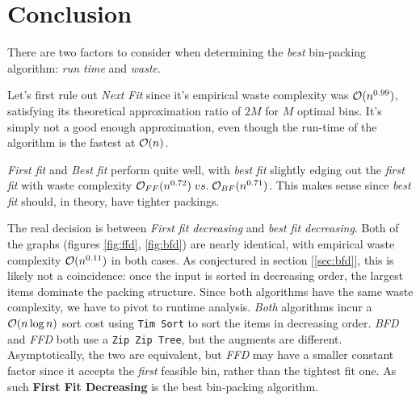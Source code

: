 \documentclass[11pt]{article}
\begin{document}
\section{Conclusion}\label{sec:conc}

There are two factors to consider when determining the \emph{best} bin-packing
algorithm: \emph{run time} and \emph{waste}.

Let's first rule out \emph{Next Fit} since it's empirical waste complexity
was $\mathcal{O}(n^{0.99})$, satisfying its theoretical approximation ratio of $2M$ for
$M$ optimal bins. It's simply not a good enough approximation, even though the
run-time of the algorithm is the fastest at $\mathcal{O}(n)$.

\emph{First fit} and \emph{Best fit} perform quite well, with \emph{best fit}
slightly edging out the \emph{first fit} with waste complexity
$\mathcal{O}_{FF}(n^{0.72}) \; vs. \; \mathcal{O}_{BF}(n^{0.71})$. This makes sense since
\emph{best fit} should, in theory, have tighter packings.

The real decision is between \emph{First fit decreasing} and
\emph{best fit decreasing}. Both of the graphs (figures \ref{fig:ffd},
\ref{fig:bfd}) are nearly identical, with empirical waste complexity
$\mathcal{O}(n^{0.11})$ in both cases. As conjectured in section [\ref{sec:bfd}],
this is likely not a coincidence: once the input is sorted in decreasing
order, the largest items dominate the packing structure.
Since both algorithms have the same waste complexity, we have to pivot to
runtime analysis. \emph{Both} algorithms incur a $\mathcal{O}(n \log n)$ sort cost
using \texttt{Tim Sort} to sort the items in decreasing order. \emph{BFD} and
\emph{FFD} both use a \texttt{Zip Zip Tree}, but the augments are different.
Asymptotically, the two are equivalent, but \emph{FFD} may have a smaller constant
factor since it accepts the \emph{first} feasible bin, rather than the tightest fit one.
As such \textbf{First Fit Decreasing} is the best bin-packing algorithm.
\end{document}
